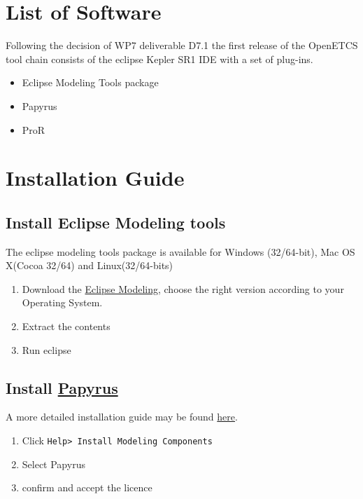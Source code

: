 \documentclass{template/openetcs_report}
\begin{document}
\begingroup
\renewcommand{\chapter}[2]{}%
  
  
\endgroup
\section{List of Software}
Following the decision of WP7 deliverable D7.1 the first release of
the OpenETCS tool chain consists of the eclipse Kepler SR1  IDE with a set of plug-ins.

\begin{itemize}
\item Eclipse Modeling Tools package 
\item Papyrus
\item ProR
\end{itemize}


\section{Installation Guide}
\subsection{Install Eclipse Modeling tools}
The eclipse modeling tools package is available for Windows
(32/64-bit), Mac OS X(Cocoa 32/64) and Linux(32/64-bits)

\begin{enumerate}
\item Download the
  \href{http://www.eclipse.org/downloads/packages/eclipse-modeling-tools/keplerr}{Eclipse
    Modeling}, choose the right version according to your Operating System.
\item Extract the contents 
\item Run eclipse
\end{enumerate}


 \subsection{Install \href{http://www.eclipse.org/papyrus/}{Papyrus}}
A more detailed installation guide may be found
\href{https://github.com/openETCS/toolchain/blob/master/ToolDescription/Papyrus/HowTo_install_papyrus_V1.2.0.pdf}{here}.
\begin{enumerate}
\item Click \verb+Help> Install Modeling Components+
\item Select Papyrus
\item confirm and accept the licence
\end{enumerate}
\end{document}

